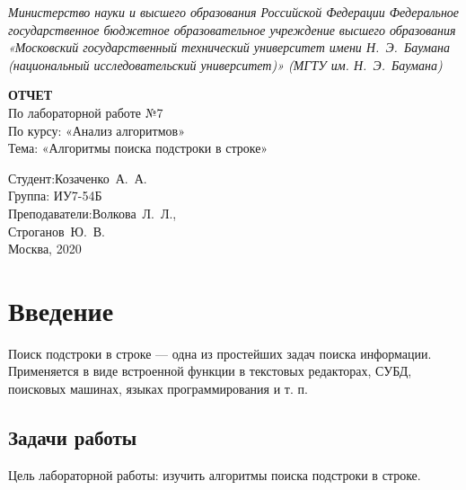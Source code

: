 \documentclass[a4paper,14pt]{extreport}
\begin{document}
\tableofcontents

\begin{titlepage}
	\centering
	
	{\footnotesize\itshape Министерство науки и высшего образования
		Российской Федерации Федеральное государственное бюджетное
		образовательное учреждение высшего образования «Московский
		государственный технический университет имени Н.~Э.~Баумана
		(национальный исследовательский университет)» (МГТУ им. Н.~Э.~Баумана)
		\\}
	
	\vspace{60mm}
	
	\textbf{ОТЧЕТ}\\
	По лабораторной работе №7\\
	По курсу: «Анализ алгоритмов»\\
	Тема: «Алгоритмы поиска подстроки в строке»\\
	
	\vspace{60mm}
	
	\hspace{70mm} Студент:\hfill Козаченко~А.~А.\\
	\hspace{70mm} Группа: \hfill ИУ7-54Б\\
	\hspace{70mm} Преподаватели:\hfill Волкова~Л.~Л.,\\
	\hfill Строганов~Ю.~В.\\
	
	\vfill
	Москва, 2020
\end{titlepage}


\chapter*{Введение}

Поиск подстроки в строке — одна из простейших задач поиска информации.
Применяется в виде встроенной функции в текстовых редакторах, СУБД, поисковых машинах, языках программирования и т. п. \cite{Gusfield}

\section*{Задачи работы}

Цель лабораторной работы: изучить алгоритмы поиска подстроки в строке.
\end{document}

